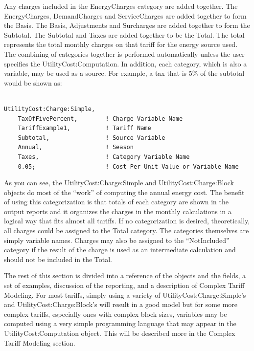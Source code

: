Any charges included in the EnergyCharges category are added together. The EnergyCharges, DemandCharges and ServiceCharges are added together to form the Basis. The Basis, Adjustments and Surcharges are added together to form the Subtotal. The Subtotal and Taxes are added together to be the Total. The total represents the total monthly charges on that tariff for the energy source used. The combining of categories together is performed automatically unless the user specifies the UtilityCost:Computation. In addition, each category, which is also a variable, may be used as a source. For example, a tax that is 5\% of the subtotal would be shown as:

\begin{lstlisting}

UtilityCost:Charge:Simple,
    TaxOfFivePercent,        ! Charge Variable Name
    TariffExample1,          ! Tariff Name
    Subtotal,                ! Source Variable
    Annual,                  ! Season
    Taxes,                   ! Category Variable Name
    0.05;                    ! Cost Per Unit Value or Variable Name
\end{lstlisting}

As you can see, the UtilityCost:Charge:Simple and UtilityCost:Charge:Block objects do most of the ``work'' of computing the annual energy cost. The benefit of using this categorization is that totals of each category are shown in the output reports and it organizes the charges in the monthly calculations in a logical way that fits almost all tariffs. If no categorization is desired, theoretically, all charges could be assigned to the Total category. The categories themselves are simply variable names. Charges may also be assigned to the ``NotIncluded'' category if the result of the charge is used as an intermediate calculation and should not be included in the Total.

The rest of this section is divided into a reference of the objects and the fields, a set of examples, discussion of the reporting, and a description of Complex Tariff Modeling. For most tariffs, simply using a variety of UtilityCost:Charge:Simple's and UtilityCost:Charge:Block's will result in a good model but for some more complex tariffs, especially ones with complex block sizes, variables may be computed using a very simple programming language that may appear in the UtilityCost:Computation object. This will be described more in the Complex Tariff Modeling section.

